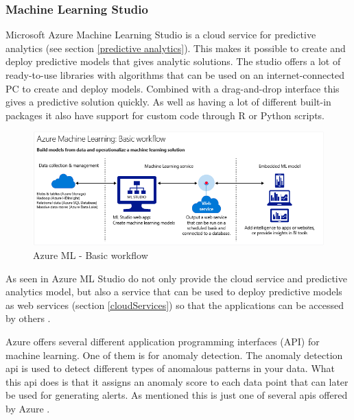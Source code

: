 \documentclass[english, a4paper]{report}
\begin{document}
{{{            \subsubsection{Machine Learning Studio}\label{AzureMLStudio}
            {
                Microsoft Azure Machine Learning Studio is a cloud service for predictive analytics (see section \ref{predictive analytics}). This makes it possible to create and deploy predictive models that gives analytic solutions. The studio offers a lot of ready-to-use libraries with algorithms that can be used on an internet-connected PC to create and deploy models. Combined with a drag-and-drop interface this gives a predictive solution quickly. As well as having a lot of different built-in packages it also have support for custom code through R or Python scripts. 
                \par
                
                \begin{figure}[H]
                    \centering
                    \includegraphics[width=\textwidth]{azureML}
                    \caption{Azure ML - Basic workflow \cite{azureML}}
                    \label{fig:azureML}
                \end{figure}
                
                As seen in  Azure ML Studio do not only provide the cloud service and predictive analytics model, but also a service that can be used to deploy predictive models as web services (section \ref{cloudServices}) so that the applications can be accessed by others \cite{azureML}. 
                \par
                
                Azure offers several different application programming interfaces (API) for machine learning. One of them is for anomaly detection. The anomaly detection \gls{api} is used to detect different types of anomalous patterns in your data. What this \gls{api} does is that it assigns an anomaly score to each data point that can later be used for generating alerts. As mentioned this is just one of several \gls{api}s offered by Azure \cite{mlAPI}. 
                \par
                
}}}}
\end{document}
